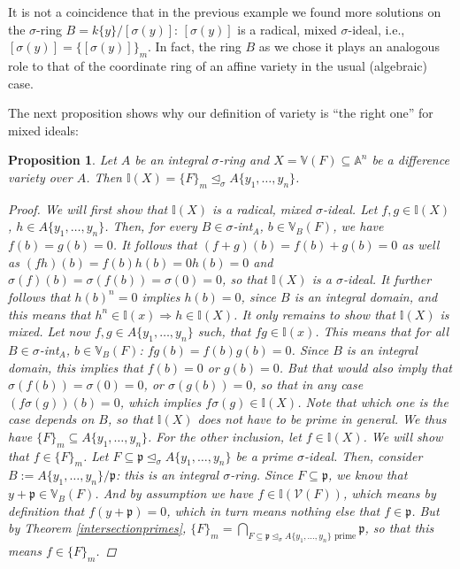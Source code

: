 \documentclass{article}
\def\I{\mathbb{I}}
\def\V{\mathcal{V}}
\def\VV{\mathbb{V}}
\def\p{\mathfrak{p}}
\def\s{\sigma}
\def\si{\unlhd_{\sigma}}
\newenvironment{bew}{\begin{proof}[Proof]}{\end{proof}}
\theoremstyle{plain}
\newtheorem{prop}[Satz]{Proposition}
\theoremstyle{definition}
\begin{document}
It is not a coincidence that in the previous example we found more solutions on the $\s$-ring $B = k\{y\}/[\s(y)]$: $[\s(y)]$ is a radical, mixed $\s$-ideal, i.e., $[\s(y)] = \{ [\s(y)] \}_m$.
In fact, the ring $B$ as we chose it plays an analogous role to that of the coordinate ring of an affine variety in the usual (algebraic) case.

The next proposition shows why our definition of variety is ``the right one'' for mixed ideals:

\begin{prop}\label{I=F_m}
Let $A$ be an integral $\s$-ring and $X = \VV(F) \subseteq \mathbb{A}^n$ be a difference variety over $A$. Then $\I(X) = \{F\}_m \si A\{y_1,\ldots,y_n\}$. 
\begin{bew}
We will first show that $\I(X)$ is a radical, mixed $\s$-ideal.
Let $f, g \in \I(X)$, $h \in A\{y_1,\ldots,y_n\}$. Then, for every $B \in \s$-int$_A$, $b \in \VV_B(F)$, we have $f(b) = g(b) = 0$.
It follows that $(f + g)(b) = f(b) + g(b) = 0$ as well as $(fh)(b) = f(b)h(b) = 0 h(b) = 0$ and $\s(f)(b) = \s(f(b)) = \s(0) = 0$, so that $\I(X)$ is a $\s$-ideal.
It further follows that $h(b)^n = 0$ implies $h(b) = 0$, since $B$ is an integral domain, and this means that $h^n \in \I(x) \Rightarrow h \in \I(X)$. It only remains to show that $\I(X)$ is mixed.
Let now $f,g \in A\{y_1,\ldots,y_n\}$ such, that $fg \in \I(x)$. This means that for all  $B \in \s$-int$_A$, $b \in \VV_B(F)$: $fg(b) = f(b) g(b) = 0$. Since $B$ is an integral domain,
this implies that $f(b) = 0$ or $g(b) = 0$. But that would also imply that $\s(f(b)) = \s(0) = 0$, or $\s(g(b)) = 0$, so that in any case $(f\s(g))(b) = 0$, which implies $f\s(g) \in \I(X)$.
Note that which one is the case depends on $B$, so that $\I(X)$ does not have to be prime in general. We thus have $\{F\}_m \subseteq A\{y_1,\ldots,y_n\}$. For the other inclusion, let $f \in \I(X)$. We will show that $f \in \{F\}_m$. Let $F \subseteq \p \si A\{y_1,\ldots,y_n\}$ be a prime $\s$-ideal.
Then, consider $B:= A\{y_1,\ldots,y_n\}/\p$: this is an integral $\s$-ring. Since $F \subseteq \p$, we know that $y + \p \in \VV_B(F)$. And by assumption we have $f \in \I(\V(F))$, which means by definition that $f(y + \p) = 0$, which
in turn means nothing else that $f \in \p$. But by Theorem \ref{intersectionprimes}, $\{F\}_m = \bigcap_{F \subseteq \p \si A\{y_1,\ldots,y_n\} \text{ prime}} \p$, so that this means $f \in \{F\}_m$.
\end{bew}
\end{prop}
\end{document}
